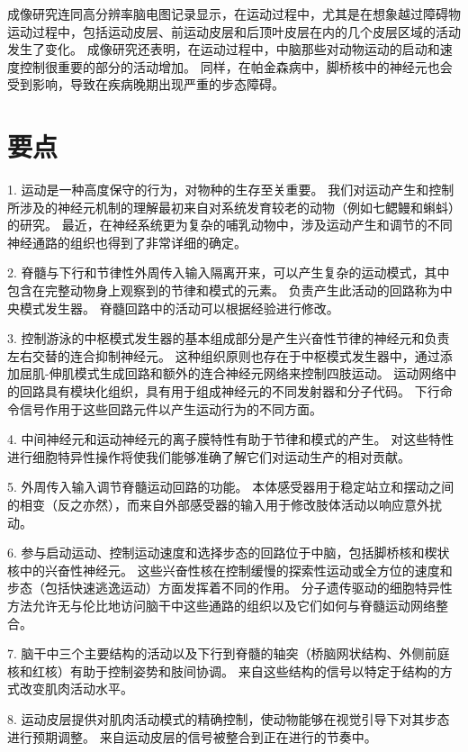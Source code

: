 成像研究连同高分辨率脑电图记录显示，在运动过程中，尤其是在想象越过障碍物运动过程中，包括运动皮层、前运动皮层和后顶叶皮层在内的几个皮层区域的活动发生了变化。
成像研究还表明，在运动过程中，中脑那些对动物运动的启动和速度控制很重要的部分的活动增加。
同样，在帕金森病中，脚桥核中的神经元也会受到影响，导致在疾病晚期出现严重的步态障碍。



\section{要点}

1. 运动是一种高度保守的行为，对物种的生存至关重要。
我们对运动产生和控制所涉及的神经元机制的理解最初来自对系统发育较老的动物（例如七鳃鳗和蝌蚪）的研究。
最近，在神经系统更为复杂的哺乳动物中，涉及运动产生和调节的不同神经通路的组织也得到了非常详细的确定。 


2. 脊髓与下行和节律性外周传入输入隔离开来，可以产生复杂的运动模式，其中包含在完整动物身上观察到的节律和模式的元素。
负责产生此活动的回路称为中央模式发生器。 
脊髓回路中的活动可以根据经验进行修改。


3. 控制游泳的中枢模式发生器的基本组成部分是产生兴奋性节律的神经元和负责左右交替的连合抑制神经元。
这种组织原则也存在于中枢模式发生器中，通过添加屈肌-伸肌模式生成回路和额外的连合神经元网络来控制四肢运动。
运动网络中的回路具有模块化组织，具有用于组成神经元的不同发射器和分子代码。
下行命令信号作用于这些回路元件以产生运动行为的不同方面。


4. 中间神经元和运动神经元的离子膜特性有助于节律和模式的产生。
对这些特性进行细胞特异性操作将使我们能够准确了解它们对运动生产的相对贡献。


5. 外周传入输入调节脊髓运动回路的功能。
本体感受器用于稳定站立和摆动之间的相变（反之亦然），而来自外部感受器的输入用于修改肢体活动以响应意外扰动。 


6. 参与启动运动、控制运动速度和选择步态的回路位于中脑，包括脚桥核和楔状核中的兴奋性神经元。
这些兴奋性核在控制缓慢的探索性运动或全方位的速度和步态（包括快速逃逸运动）方面发挥着不同的作用。
分子遗传驱动的细胞特异性方法允许无与伦比地访问脑干中这些通路的组织以及它们如何与脊髓运动网络整合。 


7. 脑干中三个主要结构的活动以及下行到脊髓的轴突（桥脑网状结构、外侧前庭核和红核）有助于控制姿势和肢间协调。
来自这些结构的信号以特定于结构的方式改变肌肉活动水平。


8. 运动皮层提供对肌肉活动模式的精确控制，使动物能够在视觉引导下对其步态进行预期调整。
来自运动皮层的信号被整合到正在进行的节奏中。


